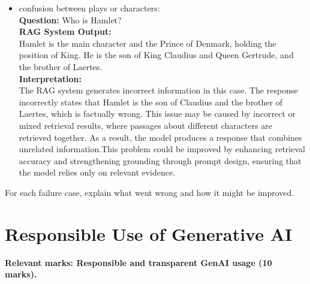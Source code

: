 \documentclass[10pt,conference]{IEEEtran}
\begin{document}
\begin{itemize}
    \textbf{Interpretation:}\\
    The RAG system does not perform well in this case because it fails to follow the instruction targeting an 8-year-old audience. Although the response is factually reasonable, the explanation uses complex vocabulary and detailed narrative structure, making it difficult for a child to understand. This indicates a limitation in style control rather than factual correctness or grounding. The model focuses on providing a formal summary instead of simplifying the content. This issue could be improved by strengthening prompt design, such as explicitly requiring simple vocabulary, short sentences, and child-friendly explanations, ensuring the output matches the intended audience.\\
    \item confusion between plays or characters:\\
    \textbf{Question:} Who is Hamlet?\\
    \textbf{RAG System Output:}  \\
   Hamlet is the main character and the Prince of Denmark, holding the position of King. He is the son of King Claudius and Queen Gertrude, and the brother of Laertes.\\
    
    \textbf{Interpretation:}\\
   The RAG system generates incorrect information in this case. 
    The response incorrectly states that Hamlet is the son of Claudius and the brother of Laertes, which is factually wrong. This issue may be caused by incorrect or mixed retrieval results, where passages about different characters are retrieved together. As a result, the model produces a response that combines unrelated information.This problem could be improved by enhancing retrieval accuracy and strengthening grounding through prompt design, ensuring that the model relies only on relevant evidence.
    
    
\end{itemize}

For each failure case, explain what went wrong and how it might be improved.

\section{Responsible Use of Generative AI}
\label{sec:genai}

\textbf{Relevant marks: Responsible and transparent GenAI usage (10 marks).}
\end{document}
